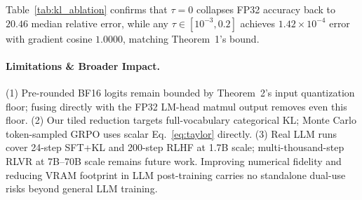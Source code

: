 \documentclass[10pt]{article}
\begin{document}
Table~\ref{tab:kl_ablation} confirms that $\tau=0$ collapses FP32 accuracy back to $20.46$ median relative error, while any $\tau \in [10^{-3}, 0.2]$ achieves $1.42\times 10^{-4}$ error with gradient cosine $1.0000$, matching Theorem~1's bound.
\paragraph{Limitations \& Broader Impact.} (1) Pre-rounded BF16 logits remain bounded by Theorem~2's input quantization floor; fusing directly with the FP32 LM-head matmul output removes even this floor. (2) Our tiled reduction targets full-vocabulary categorical KL; Monte Carlo token-sampled GRPO uses scalar Eq.~\eqref{eq:taylor} directly. (3) Real LLM runs cover 24-step SFT+KL and 200-step RLHF at 1.7B scale; multi-thousand-step RLVR at 7B--70B scale remains future work. Improving numerical fidelity and reducing VRAM footprint in LLM post-training carries no standalone dual-use risks beyond general LLM training.



\end{document}
